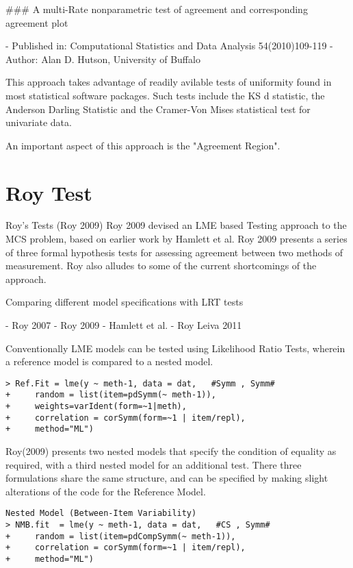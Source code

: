 \documentclass[]{article}
\begin{document}


### A multi-Rate nonparametric test of agreement and corresponding agreement plot

- Published in: Computational Statistics and Data Analysis 54(2010)109-119
- Author: Alan D. Hutson, University of Buffalo



This approach takes advantage of readily avilable tests of uniformity found in most statistical software packages.
Such tests include the KS d statistic, the Anderson Darling Statistic and the Cramer-Von Mises statistical test for univariate data.

An important aspect of this approach is the "Agreement Region".



\section*{Roy Test}

Roy’s Tests (Roy 2009)
Roy 2009 devised an LME based Testing approach to the MCS problem, based on earlier work by Hamlett et al. 
Roy 2009 presents a series of three formal hypothesis tests for assessing agreement between two methods of measurement.
Roy also alludes to some of the current shortcomings of the approach.


Comparing different model specifications with LRT tests

- Roy 2007
- Roy 2009
- Hamlett et al.
- Roy Leiva 2011



Conventionally LME models can be tested using Likelihood Ratio Tests, wherein a reference model is compared to a nested model.
\begin{verbatim}
> Ref.Fit = lme(y ~ meth-1, data = dat,   #Symm , Symm#
+     random = list(item=pdSymm(~ meth-1)), 
+     weights=varIdent(form=~1|meth),
+     correlation = corSymm(form=~1 | item/repl), 
+     method="ML")
\end{verbatim}
Roy(2009) presents two nested models that specify the condition of equality as required, with a third nested model for an additional test. There three formulations share the same structure, and can be specified by making slight alterations of the code for the Reference Model.
\begin{verbatim}
Nested Model (Between-Item Variability)
> NMB.fit  = lme(y ~ meth-1, data = dat,   #CS , Symm#
+     random = list(item=pdCompSymm(~ meth-1)),
+     correlation = corSymm(form=~1 | item/repl), 
+     method="ML")
\end{verbatim}
\end{document}
